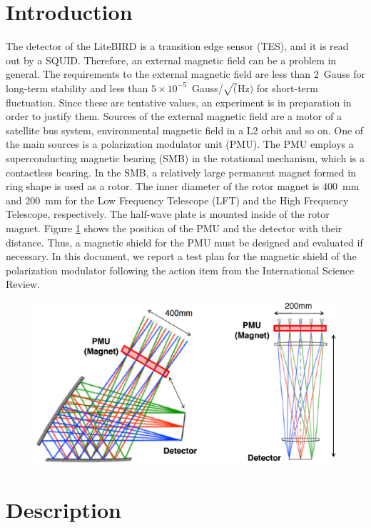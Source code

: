 \documentclass[11pt]{article}
\begin{document}
\section{Introduction}
The detector of the LiteBIRD is a transition edge sensor (TES), and it is read out by a SQUID.
Therefore, an external magnetic field can be a problem in general.
The requirements to the external magnetic field are less than 2~Gauss for long-term stability and less than $5\times10^{-5}$~Gauss/$\sqrt(\mathrm{Hz})$ for short-term fluctuation.
Since these are tentative values, an experiment is in preparation in order to justify them.
Sources of the external magnetic field are a motor of a satellite bus system, environmental magnetic field in a L2 orbit and so on.
One of the main sources is a polarization modulator unit (PMU).
The PMU employs a superconducting magnetic bearing (SMB) in the rotational mechanism, which is a contactless bearing.%
In the SMB, a relatively large permanent magnet formed in ring shape is used as a rotor.
The inner diameter of the rotor magnet is 400~mm and 200~mm for the Low Frequency Telescope (LFT) and the High Frequency Telescope, respectively.
The half-wave plate is mounted inside of the rotor magnet.
Figure \ref{fig:telescope} shows the position of the PMU and the detector with their distance.
Thus, a magnetic shield for the PMU must be designed and evaluated if necessary.
In this document, we report a test plan for the magnetic shield of the polarization modulator following the action item from the International Science Review.

\begin{figure}[htbp]
  \centering
  \includegraphics[width=150mm]{figs/Telescope.eps}
  \caption{}
  \label{fig:telescope}
\end{figure}

\section{Description}
\end{document}
